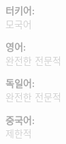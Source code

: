 \documentclass[10pt,a4paper]{article}
\begin{document}
\vspace{1pt}
\noindent
\begin{minipage}[t]{0.24\textwidth}
  \textcolor{darkgray}{\textbf{터키어:}} \\
  \textcolor{lightgray}{\small 모국어}
\end{minipage}%
\hfill
\begin{minipage}[t]{0.24\textwidth}
  \textcolor{darkgray}{\textbf{영어:}} \\
  \textcolor{lightgray}{\small 완전한 전문적}
\end{minipage}%
\hfill
\begin{minipage}[t]{0.24\textwidth}
  \textcolor{darkgray}{\textbf{독일어:}} \\
  \textcolor{lightgray}{\small 완전한 전문적}
\end{minipage}%
\hfill
\begin{minipage}[t]{0.24\textwidth}
  \textcolor{darkgray}{\textbf{중국어:}} \\
  \textcolor{lightgray}{\small 제한적}
\end{minipage}
\end{document}
